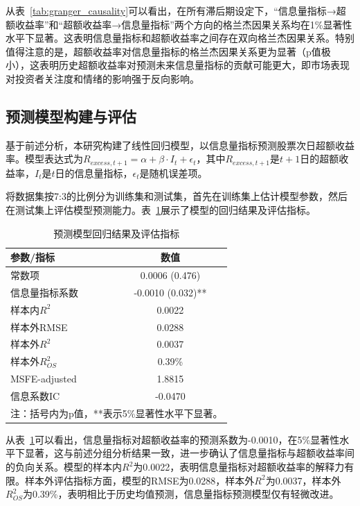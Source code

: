 \documentclass[12pt, a4paper]{article}
\begin{document}
从表~\ref{tab:granger_causality}可以看出，在所有滞后期设定下，“信息量指标→超额收益率”和“超额收益率→信息量指标”两个方向的格兰杰因果关系均在1\%显著性水平下显著。这表明信息量指标和超额收益率之间存在双向格兰杰因果关系。特别值得注意的是，超额收益率对信息量指标的格兰杰因果关系更为显著（p值极小），这表明历史超额收益率对预测未来信息量指标的贡献可能更大，即市场表现对投资者关注度和情绪的影响强于反向影响。

\subsection{预测模型构建与评估}

基于前述分析，本研究构建了线性回归模型，以信息量指标预测股票次日超额收益率。模型表达式为$R_{excess,t+1} = \alpha + \beta \cdot I_t + \epsilon_t$，其中$R_{excess,t+1}$是$t+1$日的超额收益率，$I_t$是$t$日的信息量指标，$\epsilon_t$是随机误差项。

将数据集按7:3的比例分为训练集和测试集，首先在训练集上估计模型参数，然后在测试集上评估模型预测能力。表~\ref{tab:model_performance}展示了模型的回归结果及评估指标。

\begin{table}[htbp]
\centering
\caption{预测模型回归结果及评估指标}
\label{tab:model_performance}
\begin{tabular}{lc}
\toprule
\textbf{参数/指标} & \textbf{数值} \\
\midrule
常数项 & 0.0006 (0.476) \\
信息量指标系数 & -0.0010 (0.032)** \\
\midrule
样本内$R^2$ & 0.0022 \\
样本外RMSE & 0.0288 \\
样本外$R^2$ & 0.0037 \\
样本外$R^2_{OS}$ & 0.39\% \\
MSFE-adjusted & 1.8815 \\
信息系数IC & -0.0470 \\
\bottomrule
\multicolumn{2}{l}{\footnotesize{注：括号内为p值，**表示5\%显著性水平下显著。}} \\
\end{tabular}
\end{table}

从表~\ref{tab:model_performance}可以看出，信息量指标对超额收益率的预测系数为-0.0010，在5\%显著性水平下显著，这与前述分组分析结果一致，进一步确认了信息量指标与超额收益率间的负向关系。模型的样本内$R^2$为0.0022，表明信息量指标对超额收益率的解释力有限。样本外评估指标方面，模型的RMSE为0.0288，样本外$R^2$为0.0037，样本外$R^2_{OS}$为0.39\%，表明相比于历史均值预测，信息量指标预测模型仅有轻微改进。
\end{document}
